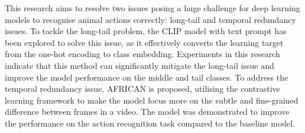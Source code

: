 This research aims to resolve two issues posing a huge challenge for deep learning models to recognise animal actions correctly: long-tail and temporal redundancy issues. To tackle the long-tail problem, the CLIP model with text prompt has been explored to solve this issue, as it effectively converts the learning target from the one-hot encoding to class embedding. Experiments in this research indicate that this method can significantly mitigate the long-tail issue and improve the model performance on the middle and tail classes. To address the temporal redundancy issue, AFRICAN is proposed, utilising the contrastive learning framework to make the model focus more on the subtle and fine-grained difference between frames in a video. The model was demonstrated to improve the performance on the action recognition task compared to the baseline model.
